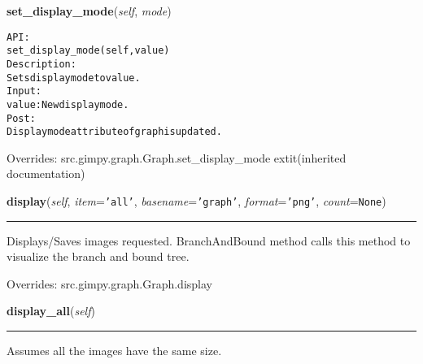     \vspace{0.5ex}

\hspace{.8\funcindent}\begin{boxedminipage}{\funcwidth}

    \raggedright \textbf{set\_display\_mode}(\textit{self}, \textit{mode})

\setlength{\parskip}{2ex}
\begin{alltt}

API:
    set\_display\_mode(self, value)
Description:
    Sets display mode to value.
Input:
    value: New display mode.
Post:
    Display mode attribute of graph is updated.
\end{alltt}

\setlength{\parskip}{1ex}
      Overrides: src.gimpy.graph.Graph.set\_display\_mode 	extit{(inherited documentation)}

    \end{boxedminipage}

    \vspace{0.5ex}

\hspace{.8\funcindent}\begin{boxedminipage}{\funcwidth}

    \raggedright \textbf{display}(\textit{self}, \textit{item}={\tt \texttt{'}\texttt{all}\texttt{'}}, \textit{basename}={\tt \texttt{'}\texttt{graph}\texttt{'}}, \textit{format}={\tt \texttt{'}\texttt{png}\texttt{'}}, \textit{count}={\tt None})

    \vspace{-1.5ex}

    \rule{\textwidth}{0.5\fboxrule}
\setlength{\parskip}{2ex}
    Displays/Saves images requested. BranchAndBound method calls this 
    method to visualize the branch and bound tree.

\setlength{\parskip}{1ex}
      Overrides: src.gimpy.graph.Graph.display

    \end{boxedminipage}

    \label{coinor:grumpy:BB:BBTree:display_all}

    \vspace{0.5ex}

\hspace{.8\funcindent}\begin{boxedminipage}{\funcwidth}

    \raggedright \textbf{display\_all}(\textit{self})

    \vspace{-1.5ex}

    \rule{\textwidth}{0.5\fboxrule}
\setlength{\parskip}{2ex}
    Assumes all the images have the same size.

\setlength{\parskip}{1ex}
    \end{boxedminipage}

